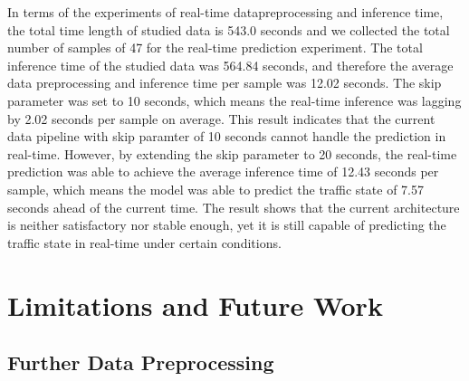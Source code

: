 \documentclass[11pt]{uonthesis}
\begin{document}
In terms of the experiments of real-time datapreprocessing and inference time, the total time length of studied data is 543.0 seconds and we collected the total number of samples of 47 for the real-time prediction experiment. The total inference time of the studied data was 564.84 seconds, and therefore the average data preprocessing and inference time per sample was 12.02 seconds. The skip parameter was set to 10 seconds, which means the real-time inference was lagging by 2.02 seconds per sample on average. This result indicates that the current data pipeline with skip paramter of 10 seconds cannot handle the prediction in real-time. However, by extending the skip parameter to 20 seconds, the real-time prediction was able to achieve the average inference time of 12.43 seconds per sample, which means the model was able to predict the traffic state of 7.57 seconds ahead of the current time. The result shows that the current architecture is neither satisfactory nor stable enough, yet it is still capable of predicting the traffic state in real-time under certain conditions. %

\chapter{Limitations and Future Work}

\section{Further Data Preprocessing}
\end{document}
